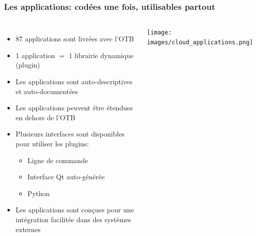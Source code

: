 \documentclass[8pt]{beamer}
\begin{document}
\begin{frame}
\frametitle{Les applications: codées une fois, utilisables partout}
\begin{columns}
\begin{itemize}
\item 87 applications sont livrées avec l'OTB
\item 1 application $=$ 1 librairie dynamique (plugin)
\item Les applications sont auto-descriptives et auto-documentées
\item Les applications peuvent être étendues en dehors de l'OTB
\item Plusieurs interfaces sont disponibles pour utiliser les plugins:
\begin{itemize}
  \item Ligne de commande
  \item Interface Qt auto-générée
  \item Python
\end{itemize}
\item Les applications sont conçues pour une intégration facilitée dans des systèmes externes
\end{itemize}
\texttt{[image: images/cloud\_applications.png]}
\end{columns}
\end{frame}
\end{document}
